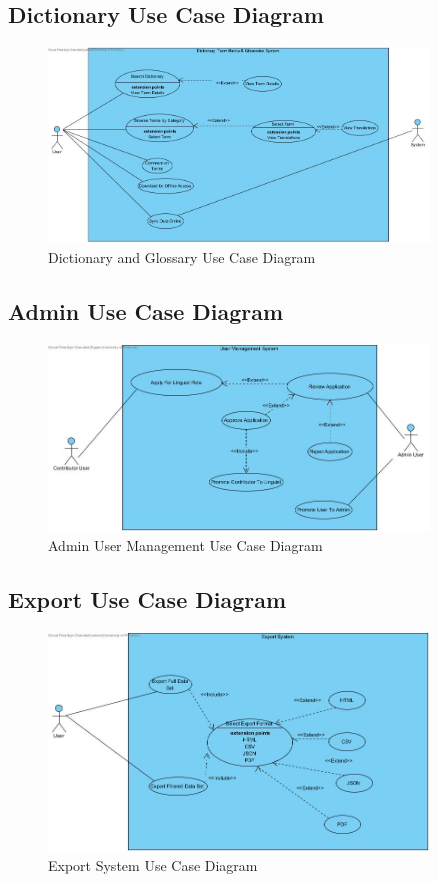 \documentclass[12pt]{article}
\begin{document}
\subsection{Dictionary Use Case Diagram}
\begin{figure}[H]
  \centering
  \includegraphics[width=0.9\textwidth]{Dictionary,Glossaies and Term Banl.jpg}
  \caption{Dictionary and Glossary Use Case Diagram}
  \label{fig:dictionary-use-case}
\end{figure}

\subsection{Admin Use Case Diagram}
\begin{figure}[H]
  \centering
  \includegraphics[width=0.9\textwidth]{Admin-User-Management.jpg}
  \caption{Admin User Management Use Case Diagram}
  \label{fig:admin-use-case}
\end{figure}

\subsection{Export Use Case Diagram}
\begin{figure}[H]
  \centering
  \includegraphics[width=0.9\textwidth]{Export System.jpg}
  \caption{Export System Use Case Diagram}
  \label{fig:export-use-case}
\end{figure}
\end{document}
